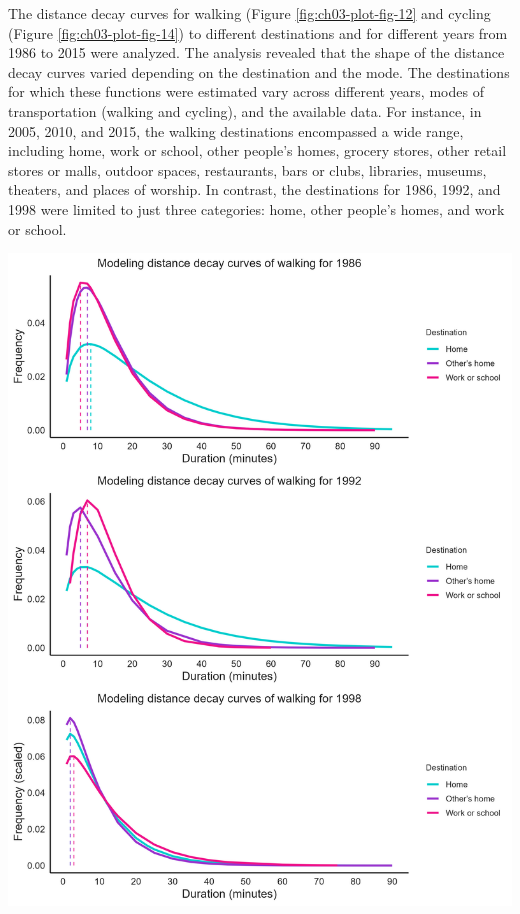 \documentclass[
11pt, %
oneside, %
english, %
singlespacing, %
]{macthesis} %
\begin{document}
The distance decay curves for walking (Figure \ref{fig:ch03-plot-fig-12} and cycling (Figure \ref{fig:ch03-plot-fig-14}) to different destinations and for different years from 1986 to 2015 were analyzed. The analysis revealed that the shape of the distance decay curves varied depending on the destination and the mode. The destinations for which these functions were estimated vary across different years, modes of transportation (walking and cycling), and the available data. For instance, in 2005, 2010, and 2015, the walking destinations encompassed a wide range, including home, work or school, other people's homes, grocery stores, other retail stores or malls, outdoor spaces, restaurants, bars or clubs, libraries, museums, theaters, and places of worship. In contrast, the destinations for 1986, 1992, and 1998 were limited to just three categories: home, other people's homes, and work or school.

\begin{center}\includegraphics[width=1\linewidth]{figure/ch03_fig_11} \end{center}
\end{document}

